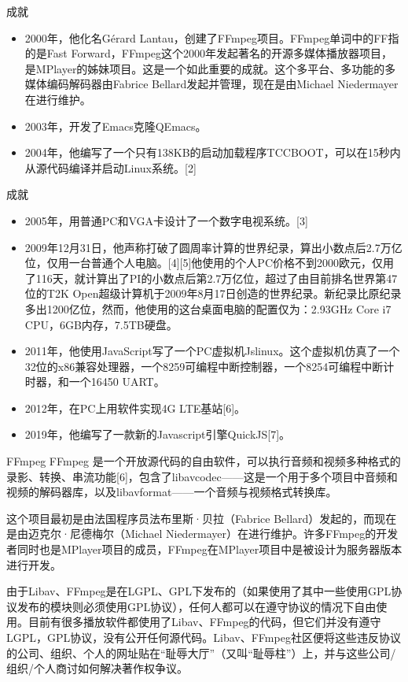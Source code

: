 \documentclass{beamer}
\begin{document}
\begin{frame}[t]{成就}
    \begin{itemize}
        \item 2000年，他化名Gérard Lantau，创建了FFmpeg项目。FFmpeg单词中的FF指的是Fast Forward，FFmpeg这个2000年发起著名的开源多媒体播放器项目，是MPlayer的姊妹项目。这是一个如此重要的成就。这个多平台、多功能的多媒体编码解码器由Fabrice Bellard发起并管理，现在是由Michael Niedermayer在进行维护。
        \item 2003年，开发了Emacs克隆QEmacs。
        \item 2004年，他编写了一个只有138KB的启动加载程序TCCBOOT，可以在15秒内从源代码编译并启动Linux系统。[2]
    \end{itemize}
\end{frame}

\begin{frame}[t]{成就}
    \begin{itemize}
        \item 2005年，用普通PC和VGA卡设计了一个数字电视系统。[3]
        \item 2009年12月31日，他声称打破了圆周率计算的世界纪录，算出小数点后2.7万亿位，仅用一台普通个人电脑。[4][5]他使用的个人PC价格不到2000欧元，仅用了116天，就计算出了PI的小数点后第2.7万亿位，超过了由目前排名世界第47位的T2K Open超级计算机于2009年8月17日创造的世界纪录。新纪录比原纪录多出1200亿位，然而，他使用的这台桌面电脑的配置仅为：2.93GHz Core i7 CPU，6GB内存，7.5TB硬盘。
        \item 2011年，他使用JavaScript写了一个PC虚拟机Jslinux。这个虚拟机仿真了一个32位的x86兼容处理器，一个8259可编程中断控制器，一个8254可编程中断计时器，和一个16450 UART。
        \item 2012年，在PC上用软件实现4G LTE基站[6]。
        \item 2019年，他编写了一款新的Javascript引擎QuickJS[7]。
    \end{itemize}
    
\end{frame}

\begin{frame}[t]{FFmpeg}
    FFmpeg 是一个开放源代码的自由软件，可以执行音频和视频多种格式的录影、转换、串流功能[6]，包含了libavcodec——这是一个用于多个项目中音频和视频的解码器库，以及libavformat——一个音频与视频格式转换库。

    这个项目最初是由法国程序员法布里斯·贝拉（Fabrice Bellard）发起的，而现在是由迈克尔·尼德梅尔（Michael Niedermayer）在进行维护。许多FFmpeg的开发者同时也是MPlayer项目的成员，FFmpeg在MPlayer项目中是被设计为服务器版本进行开发。

    由于Libav、FFmpeg是在LGPL、GPL下发布的（如果使用了其中一些使用GPL协议发布的模块则必须使用GPL协议），任何人都可以在遵守协议的情况下自由使用。目前有很多播放软件都使用了Libav、FFmpeg的代码，但它们并没有遵守LGPL，GPL协议，没有公开任何源代码。Libav、FFmpeg社区便将这些违反协议的公司、组织、个人的网址贴在“耻辱大厅”（又叫“耻辱柱”）上，并与这些公司/组织/个人商讨如何解决著作权争议。
\end{frame}
\end{document}
